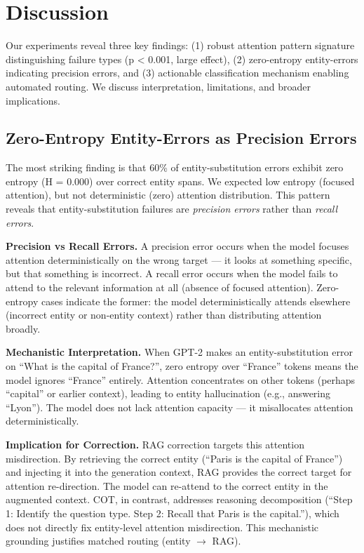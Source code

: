 \section{Discussion}
\label{sec:discussion}

Our experiments reveal three key findings: (1) robust attention pattern signature distinguishing failure types (p < 0.001, large effect), (2) zero-entropy entity-errors indicating precision errors, and (3) actionable classification mechanism enabling automated routing. We discuss interpretation, limitations, and broader implications.

\subsection{Zero-Entropy Entity-Errors as Precision Errors}

The most striking finding is that 60\% of entity-substitution errors exhibit zero entropy (H = 0.000) over correct entity spans. We expected low entropy (focused attention), but not deterministic (zero) attention distribution. This pattern reveals that entity-substitution failures are \textit{precision errors} rather than \textit{recall errors}.

\textbf{Precision vs Recall Errors.} A precision error occurs when the model focuses attention deterministically on the wrong target --- it looks at something specific, but that something is incorrect. A recall error occurs when the model fails to attend to the relevant information at all (absence of focused attention). Zero-entropy cases indicate the former: the model deterministically attends elsewhere (incorrect entity or non-entity context) rather than distributing attention broadly.

\textbf{Mechanistic Interpretation.} When GPT-2 makes an entity-substitution error on ``What is the capital of France?'', zero entropy over ``France'' tokens means the model ignores ``France'' entirely. Attention concentrates on other tokens (perhaps ``capital'' or earlier context), leading to entity hallucination (e.g., answering ``Lyon''). The model does not lack attention capacity --- it misallocates attention deterministically.

\textbf{Implication for Correction.} RAG correction targets this attention misdirection. By retrieving the correct entity (``Paris is the capital of France'') and injecting it into the generation context, RAG provides the correct target for attention re-direction. The model can re-attend to the correct entity in the augmented context. COT, in contrast, addresses reasoning decomposition (``Step 1: Identify the question type. Step 2: Recall that Paris is the capital.''), which does not directly fix entity-level attention misdirection. This mechanistic grounding justifies matched routing (entity $\to$ RAG).

